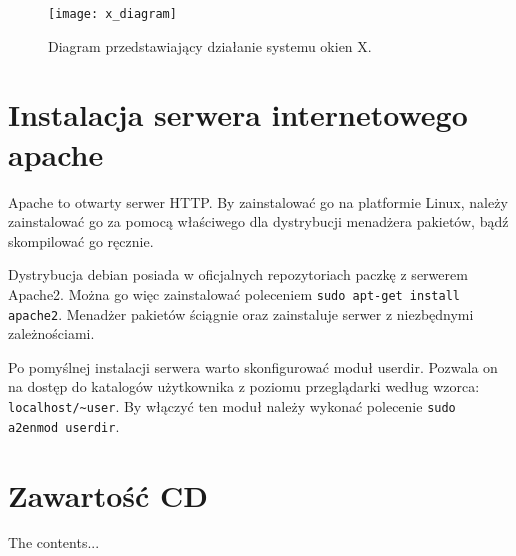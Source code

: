 \begin{appendices}
\begin{description}
\begin{figure}[H]
\begin{center}
    \texttt{[image: x\_diagram]}
\end{center}
\caption{Diagram przedstawiający działanie systemu okien X.}
\label{fig:x_diagram}
\end{figure}
	
\end{description}

\newpage
\section{Instalacja serwera internetowego apache}
\label{app:apache}
Apache to otwarty serwer HTTP. By zainstalować go na platformie Linux, należy zainstalować go za pomocą właściwego dla dystrybucji menadżera pakietów, bądź skompilować go ręcznie. 
\par
Dystrybucja debian posiada w oficjalnych repozytoriach paczkę z serwerem Apache2. Można go więc zainstalować poleceniem \lstinline{sudo apt-get install apache2}. Menadżer pakietów ściągnie oraz zainstaluje serwer z niezbędnymi zależnościami.
\par
Po pomyślnej instalacji serwera warto skonfigurować moduł userdir. Pozwala on na dostęp do katalogów użytkownika z poziomu przeglądarki według wzorca: \lstinline{localhost/~user}. By włączyć ten moduł należy wykonać polecenie \lstinline{sudo a2enmod userdir}.


\section{Zawartość CD}

The contents...

\end{appendices}
